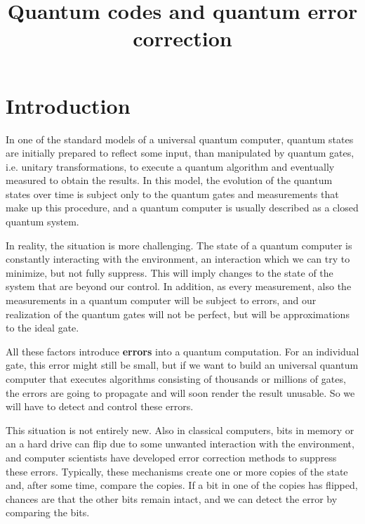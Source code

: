 \documentclass[a4paper, draft]{article}
\title{Quantum codes and quantum error correction}
\theoremstyle{own}
\theoremstyle{remark}
\begin{document}
\maketitle



\section{Introduction}

In one of the standard models of a universal quantum computer, quantum states are initially prepared to reflect some input, than manipulated by quantum gates, i.e. unitary transformations, to execute a quantum algorithm and eventually measured to obtain the results. In this model, the evolution of the quantum states over time is subject only to the quantum gates and measurements that make up this procedure, and a quantum computer is usually described as a closed quantum system.

In reality, the situation is more challenging. The state of a quantum computer is constantly interacting with the environment, an interaction which we can try to minimize, but not fully suppress. This will imply changes to the state of the system that are beyond our control. In addition, as every measurement, also the measurements in a quantum computer will be subject to errors, and our realization of the quantum gates will not be perfect, but will be approximations to the ideal gate.

All these factors introduce {\bf errors} into a quantum computation. For an individual gate, this error might still be small, but if we want to build an universal quantum computer that executes algorithms consisting of thousands or millions of gates, the errors are going to propagate and will soon render the result unusable. So we will have to detect and control these errors.

This situation is not entirely new. Also in classical computers, bits in memory or an a hard drive can flip due to some unwanted interaction with the environment, and computer scientists have developed error correction methods to suppress these errors. Typically, these mechanisms create one or more copies of the state and, after some time, compare the copies. If a bit in one of the copies has flipped, chances are that the other bits remain intact, and we can detect the error by comparing the bits.
\end{document}
